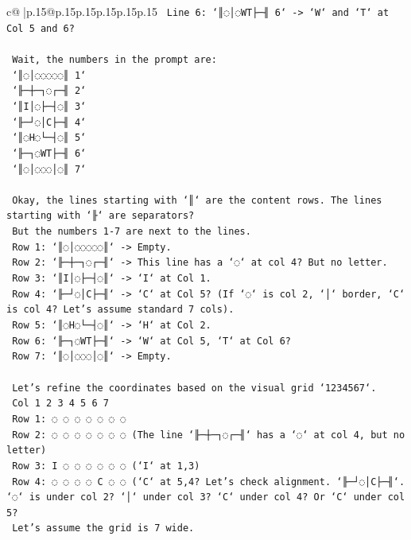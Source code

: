 \documentclass{article}
\begin{document}
{\begin{supertabular}{c@{$\;$}|p{.15\linewidth}@{}p{.15\linewidth}p{.15\linewidth}p{.15\linewidth}p{.15\linewidth}p{.15\linewidth}}
{{{\texttt{   Line 6: `║◌│◌WT├─╢ 6` {-}> `W` and `T` at Col 5 and 6?} \\
\\ 
\texttt{   Wait, the numbers in the prompt are:} \\
\texttt{   `║◌│◌◌◌◌◌║ 1`} \\
\texttt{   `╟─┼─┐◌┌─╢ 2`} \\
\texttt{   `║I│◌├─┤◌║ 3`} \\
\texttt{   `╟─┘◌│C├─╢ 4`} \\
\texttt{   `║◌H◌└─┤◌║ 5`} \\
\texttt{   `╟─┐◌WT├─╢ 6`} \\
\texttt{   `║◌│◌◌◌│◌║ 7`} \\
\\ 
\texttt{   Okay, the lines starting with `║` are the content rows. The lines starting with `╟` are separators?} \\
\texttt{   But the numbers 1{-}7 are next to the lines.} \\
\texttt{   Row 1: `║◌│◌◌◌◌◌║` {-}> Empty.} \\
\texttt{   Row 2: `╟─┼─┐◌┌─╢` {-}> This line has a `◌` at col 4? But no letter.} \\
\texttt{   Row 3: `║I│◌├─┤◌║` {-}> `I` at Col 1.} \\
\texttt{   Row 4: `╟─┘◌│C├─╢` {-}> `C` at Col 5? (If `◌` is col 2, `│` border, `C` is col 4? Let's assume standard 7 cols).} \\
\texttt{   Row 5: `║◌H◌└─┤◌║` {-}> `H` at Col 2.} \\
\texttt{   Row 6: `╟─┐◌WT├─╢` {-}> `W` at Col 5, `T` at Col 6?} \\
\texttt{   Row 7: `║◌│◌◌◌│◌║` {-}> Empty.} \\
\\ 
\texttt{   Let's refine the coordinates based on the visual grid `1234567`.} \\
\texttt{   Col 1 2 3 4 5 6 7} \\
\texttt{   Row 1: ◌ ◌ ◌ ◌ ◌ ◌ ◌} \\
\texttt{   Row 2: ◌ ◌ ◌ ◌ ◌ ◌ ◌ (The line `╟─┼─┐◌┌─╢` has a `◌` at col 4, but no letter)} \\
\texttt{   Row 3: I ◌ ◌ ◌ ◌ ◌ ◌ (`I` at 1,3)} \\
\texttt{   Row 4: ◌ ◌ ◌ ◌ C ◌ ◌ (`C` at 5,4? Let's check alignment. `╟─┘◌│C├─╢`. `◌` is under col 2? `│` under col 3? `C` under col 4? Or `C` under col 5?} \\
\texttt{   Let's assume the grid is 7 wide.} \\
}}}
\end{supertabular}}
\end{document}
